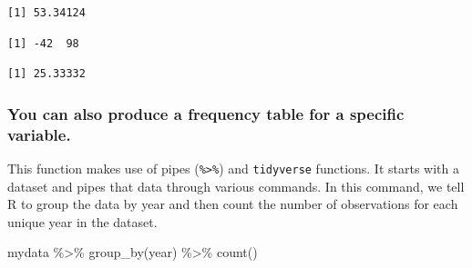 \documentclass[
]{book}
\newenvironment{Shaded}{\begin{snugshade}}{\end{snugshade}}
\newcommand{\CommentTok}[1]{\textcolor[rgb]{0.56,0.35,0.01}{\textit{#1}}}
\newcommand{\FunctionTok}[1]{\textcolor[rgb]{0.00,0.00,0.00}{#1}}
\newcommand{\NormalTok}[1]{#1}
\newcommand{\SpecialCharTok}[1]{\textcolor[rgb]{0.00,0.00,0.00}{#1}}
\begin{document}
\begin{Shaded}
\end{Shaded}

\begin{verbatim}
[1] 53.34124
\end{verbatim}

\begin{Shaded}
\end{Shaded}

\begin{verbatim}
[1] -42  98
\end{verbatim}

\begin{Shaded}
\end{Shaded}

\begin{verbatim}
[1] 25.33332
\end{verbatim}

\hypertarget{frequency}{%
\subsubsection*{You can also produce a frequency table for a specific variable.}\label{frequency}}

This function makes use of pipes (\texttt{\%\textgreater{}\%}) and \texttt{tidyverse} functions. It starts with a dataset and pipes that data through various commands. In this command, we tell R to group the data by year and then count the number of observations for each unique year in the dataset.

\begin{Shaded}
\begin{Highlighting}[]
\NormalTok{mydata }\SpecialCharTok{\%\textgreater{}\%}
  \FunctionTok{group\_by}\NormalTok{(year) }\SpecialCharTok{\%\textgreater{}\%}
  \FunctionTok{count}\NormalTok{()}
\end{Highlighting}
\end{Shaded}
\end{document}
